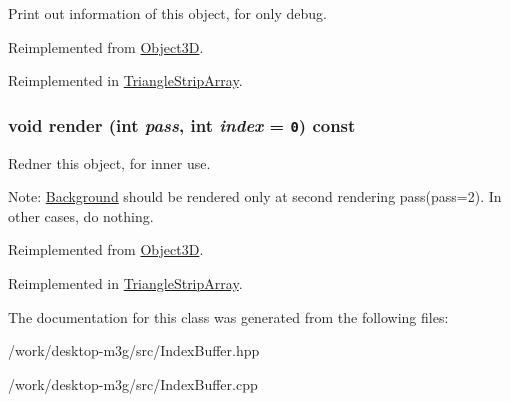 Print out information of this object, for only debug. 

Reimplemented from \hyperlink{classm3g_1_1Object3D_6fea17fa1532df3794f8cb39cb4f911f}{Object3D}.

Reimplemented in \hyperlink{classm3g_1_1TriangleStripArray_6fea17fa1532df3794f8cb39cb4f911f}{TriangleStripArray}.\hypertarget{classm3g_1_1IndexBuffer_1efcb1973989d9963d5bd6d03065d389}{
\subsubsection[{render}]{\setlength{\rightskip}{0pt plus 5cm}void render (int {\em pass}, \/  int {\em index} = {\tt 0}) const}}
\label{classm3g_1_1IndexBuffer_1efcb1973989d9963d5bd6d03065d389}


Redner this object, for inner use.

Note: \hyperlink{classm3g_1_1Background}{Background} should be rendered only at second rendering pass(pass=2). In other cases, do nothing. 

Reimplemented from \hyperlink{classm3g_1_1Object3D_1efcb1973989d9963d5bd6d03065d389}{Object3D}.

Reimplemented in \hyperlink{classm3g_1_1TriangleStripArray_1efcb1973989d9963d5bd6d03065d389}{TriangleStripArray}.

The documentation for this class was generated from the following files:\begin{CompactItemize}
\item 
/work/desktop-m3g/src/IndexBuffer.hpp\item 
/work/desktop-m3g/src/IndexBuffer.cpp\end{CompactItemize}

